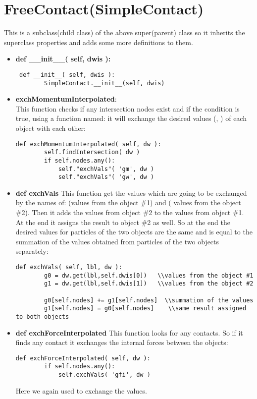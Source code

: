\documentclass[11pt,fleqn]{book} %
\begin{document}
\section{FreeContact(SimpleContact)}
This is a subclass(child class) of the above super(parent) class so it inherits the superclass properties and adds some more definitions to them.
\begin{itemize}
\item \textbf{def \_\_init\_\_( self, dwis ):}\\
\begin{lstlisting}
 def __init__( self, dwis ):
        SimpleContact.__init__(self, dwis)
\end{lstlisting}
\item \textbf{exchMomentumInterpolated}:\\
This function checks if any intersection nodes exist and if the condition is true, using a function named:  it will exchange the desired values (, ) of each object with each other:
\begin{lstlisting}
def exchMomentumInterpolated( self, dw ):
        self.findIntersection( dw )
        if self.nodes.any():
            self."exchVals"( 'gm', dw )
            self."exchVals"( 'gw', dw )
\end{lstlisting}
\item \textbf{def exchVals}
This function get the values which are going to be exchanged by the names of:  (values from the object \#1) and ( values from the object \#2). Then it adds the values from object \#2 to the values from object \#1. At the end it assigns the result to object \#2 as well. So at the end the desired values for particles of the two objects are the same and is equal to the summation of the values obtained from particles of the two objects separately:
\begin{lstlisting}
def exchVals( self, lbl, dw ):
        g0 = dw.get(lbl,self.dwis[0])   \\values from the object #1
        g1 = dw.get(lbl,self.dwis[1])   \\values from the object #2
       
        g0[self.nodes] += g1[self.nodes]  \\summation of the values
        g1[self.nodes] = g0[self.nodes]    \\same result assigned to both objects
\end{lstlisting}
\item \textbf{def exchForceInterpolated}
This function looks for any contacts. So if it finds any contact it exchanges the internal forces between the objects:
\begin{lstlisting}
def exchForceInterpolated( self, dw ):
        if self.nodes.any():
            self.exchVals( 'gfi', dw )
\end{lstlisting}
Here we again used  to exchange the values. 
\end{itemize}
\end{document}
